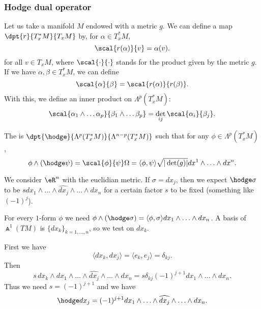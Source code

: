 \subsubsection{Hodge dual operator}
Let us take a manifold $M$ endowed with a metric $g$.  We can define a map $\dpt{r}{T^*_xM}{T_xM}$ by, for $\alpha\in T^*_xM$,
\[
   \scal{r(\alpha)}{v}=\alpha(v).
\]
for all $v\in T_xM$, where $\scal{\cdot}{\cdot}$ stands for the product given by the metric $g$. If we have $\alpha,\beta\in T^*_xM$, we can define
\[
   \scal{\alpha}{\beta}=\scal{r(\alpha)}{r(\beta)}.
\]
With this, we define an inner product on $\Lambda^p(T^*_xM)$:
\[
   \scal{\alpha_1\wedge\ldots\alpha_p}{\beta_1\wedge\ldots\beta_p}=\det_{ij}\scal{\alpha_i}{\beta_j}.
\]

\begin{definition}      \label{DEFooUOJQooSzKjNR}
    The  is $\dpt{\hodge}{\Lambda^p(T^*_xM)}{\Lambda^{n-p}(T^*_xM)}$ such that for any $\phi\in\Lambda^p(T^*_xM)$,
    \begin{equation}
       \phi\wedge(\hodge\psi)=\scal{\phi}{\psi}\Omega=\langle \phi,\psi \rangle\sqrt{|\det(g)|}dx^1\wedge\ldots\wedge dx^n.
    \end{equation}
\end{definition}

\begin{example} \label{EXooCIYIooFPMLMU}
    We consider \( \eR^n\) with the euclidian metric. If \( \sigma=dx_j\), then we expect \( \hodge\sigma\) to be \( sdx_1\wedge\ldots\wedge \widehat{dx_j}\wedge\ldots\wedge dx_n\) for a certain factor \( s\) to be fixed (something like \( (-1)^j\)).

    For every \( 1\)-form \( \phi\) we need \( \phi\wedge(\hodge \sigma)=\langle \phi, \sigma\rangle dx_1\wedge\ldots\wedge dx_n\). A basis of \( \Wedge^1(TM)\) is \( \{ dx_k \}_{k=1,\ldots, n}\), so we test on \( dx_k\).

    First we have
    \begin{equation}
        \langle dx_k, dx_j\rangle =\langle e_k, e_j\rangle =\delta_{kj}.
    \end{equation}
    Then
    \begin{equation}
        s\,dx_k\wedge dx_1\wedge\ldots\wedge \widehat{dx_j}\wedge\ldots\wedge dx_n=s\delta_{kj}(-1)^{j+1}dx_1\wedge\ldots\wedge dx_n.
    \end{equation}
    Thus we need \( s=(-1)^{j+1}\) and we have
    \begin{equation}
        \hodge dx_j=(-1)^{j+1}dx_1\wedge\ldots\wedge \widehat{dx_j}\wedge\ldots\wedge dx_n.
    \end{equation}
\end{example}

